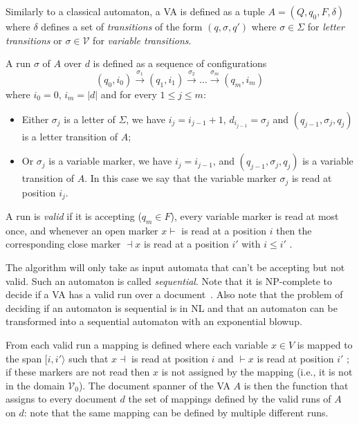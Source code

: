 \documentclass[12px]{article}
\begin{document}
        Similarly to a classical automaton, a VA is defined as a tuple $A = (Q,
        q_0, F, \delta)$ where $\delta$ defines a set of \textit{transitions}
        of the form $(q, \sigma, q')$ where $\sigma \in \Sigma$ for
        \textit{letter transitions} or $\sigma \in \mathcal{V}$ for
        \textit{variable transitions}.

        A run $\sigma$ of $A$ over $d$ is defined as a sequence of
        configurations
          \[ (q_0, i_0) \xrightarrow{\sigma_1} (q_1, i_1)
          \xrightarrow{\sigma_2} \ldots \xrightarrow{\sigma_m} (q_m, i_m) \]
        where $i_0 = 0$, $i_m = |d|$ and for every $1 \leq j \leq m$:
        \begin{itemize}
          \item Either $\sigma_j$ is a letter of $\Sigma$, we have $i_j =
            i_{j-1} + 1$, $d_{i_{j-1}} = \sigma_j$ and $(q_{j-1}, \sigma_j,
            q_j)$ is a letter transition of $A$;
          \item Or $\sigma_j$ is a variable marker, we have $i_j = i_{j-1}$,
            and $(q_{j-1}, \sigma_j, q_j)$ is a variable transition of $A$. In
            this case we say that the variable marker $\sigma_j$ is read at
            position $i_j$.
        \end{itemize}


        A run is \textit{valid} if it is accepting ($q_m \in F$), every
        variable marker is read at most once, and whenever an open marker $x
        \vdash$ is read at a position $i$ then the corresponding close marker
        $\dashv x$ is read at a position $i'$ with $i \leq i'$ .

        The algorithm will only take as input automata that can't be accepting
        but not valid. Such an automaton is called \textit{sequential}. Note
        that it is NP-complete to decide if a VA has a valid run over a
        document~\cite{freydenberger:LIPIcs:2017}. Also note that the problem
        of deciding if an automaton is sequential is in NL and that an
        automaton can be transformed into a sequential automaton with an
        exponential blowup.

        From each valid run a mapping is defined where each variable $x \in V$
        is mapped to the span $[i, i'\rangle$ such that $x \dashv$ is read at
        position $i$ and $\vdash x$ is read at position $i'$ ; if these markers
        are not read then $x$ is not assigned by the mapping (i.e., it is not
        in the domain $\mathcal{V}_0$). The document spanner of the VA $A$ is
        then the function that assigns to every document $d$ the set of
        mappings defined by the valid runs of $A$ on $d$: note that the same
        mapping can be defined by multiple different runs.
\end{document}
